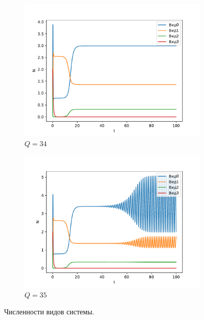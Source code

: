     \begin{figure}[H]
        \centering
        \begin{subfigure}[t]{.3\linewidth}
            \centering
            \includegraphics[width=\textwidth]{pictures/exp_flow/exp2_Q34.pdf}
            \caption{\(Q = 34\)}
        \end{subfigure}
        \begin{subfigure}[t]{.3\linewidth}
            \centering
            \includegraphics[width=\textwidth]{pictures/exp_flow/exp2_Q35.pdf}
            \caption{\(Q = 35\)}
        \end{subfigure}
    \caption{Численности видов системы.}  \label{fig:flow_exp2_q2}
    \end{figure}
    

